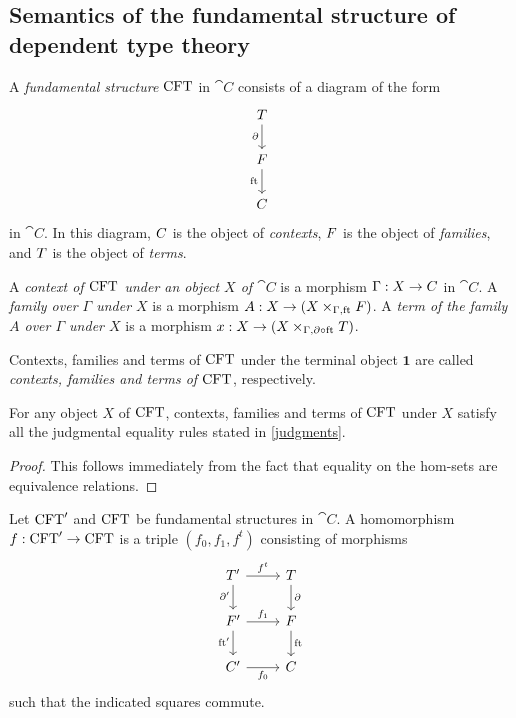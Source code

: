 \subsection{Semantics of the fundamental structure of dependent type theory}

\begin{defn}
A \emph{fundamental structure} $\mathrm{CFT}$ in $\cat{C}$ consists of a diagram of the form
\begin{equation*}
\begin{tikzcd}
\stesyst
  \ar{d}[swap]{\ebd}
  \\
\stesysf
  \ar{d}[swap]{\eft}
  \\
\stesysc
\end{tikzcd}
\end{equation*}
in $\cat{C}$. In this diagram, $C$ is the object of \emph{contexts}, $F$ is
the object of \emph{families}, and $T$ is the object of \emph{terms}.
\end{defn}

\begin{defn}
A \emph{context of $\mathrm{CFT}$ under an object $X$ of $\cat{C}$} is a morphism $\Gamma:X\to C$ in
$\cat{C}$. A \emph{family over $\Gamma$ under $X$} is a morphism
$A:X\to (\pullback{X}{\stesysf}{\Gamma}{\eft})$. A 
\emph{term of the family $A$ over $\Gamma$ under $X$}
is a morphism $x:X\to(\pullback{X}{\stesyst}{\Gamma}{\ebd\circ\eft})$.

Contexts, families and terms of $\mathrm{CFT}$ under the terminal object $\mathbf{1}$
are called \emph{contexts, families and terms of $\mathrm{CFT}$}, respectively.
\end{defn}

\begin{lem}
For any object $X$ of $\mathrm{CFT}$, contexts, families and terms of $\mathrm{CFT}$ under
$X$ satisfy all the judgmental equality rules stated in \autoref{judgments}.
\end{lem}

\begin{proof}
This follows immediately from the fact that equality on the hom-sets are
equivalence relations.
\end{proof}

\begin{defn}
Let $\mathrm{CFT}'$ and $\mathrm{CFT}$ be fundamental structures in $\cat{C}$. A
homomorphism $f:\mathrm{CFT}'\to\mathrm{CFT}$ is a triple $(f_0,f_1,f^t)$ 
consisting of morphisms
\begin{equation*}
\begin{tikzcd}
\stesyst' 
  \ar{r}{f^t}
  \ar{d}[swap]{\ebd'}
  &
\stesyst
  \ar{d}{\ebd}
  \\
\stesysf'
  \ar{r}{f_1}
  \ar{d}[swap]{\eft'}
  &
\stesysf
  \ar{d}{\eft}
  \\
\stesysc' 
  \ar{r}[swap]{f_0}
  &
\stesysc
\end{tikzcd}
\end{equation*}
such that the indicated squares commute.
\end{defn}

